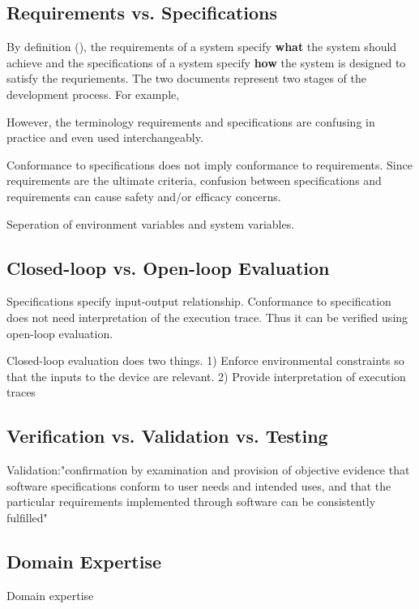 \subsection{Requirements vs. Specifications}
By definition (\cite{fda3}), the requirements of a system specify \textbf{what} the system should achieve and the specifications of a system specify \textbf{how} the system is designed to satisfy the requriements. The two documents represent two stages of the development process. For example,

However, the terminology requirements and specifications are confusing in practice and even used interchangeably. \cite{reqVSspec} 

Conformance to specifications does not imply conformance to requirements. Since requirements are the ultimate criteria, confusion between specifications and requirements can cause safety and/or efficacy concerns.

Seperation of environment variables and system variables.
\subsection{Closed-loop vs. Open-loop Evaluation}
Specifications specify input-output relationship. Conformance to specification does not need interpretation of the execution trace. Thus it can be verified using open-loop evaluation.

Closed-loop evaluation does two things. 1) Enforce environmental constraints so that the inputs to the device are relevant. 2) Provide interpretation of execution traces 

\subsection{Verification vs. Validation vs. Testing}

Validation:"confirmation by examination and provision of objective evidence that software specifications conform to user needs and intended uses, and that the particular requirements implemented through software can be consistently fulfilled"\cite{ISO8402,fda2}
\subsection{Domain Expertise}
Domain expertise 
